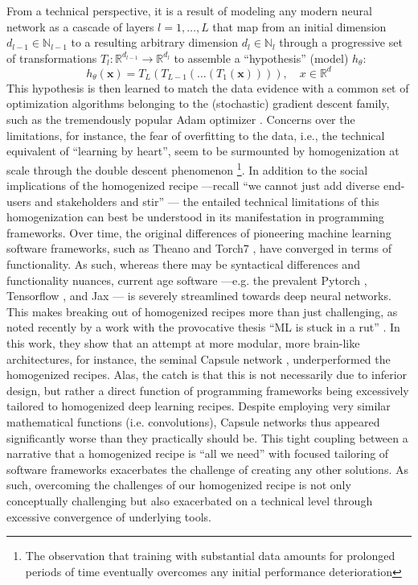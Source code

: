 \documentclass[manuscript,screen,authorversion,nonacm]{acmart}
\begin{document}
From a technical perspective, it is a result of modeling any modern neural network as a cascade of layers $l = 1, \ldots, L$ that map from an initial dimension $d_{l-1} \in \mathbb{N}_{l-1}$ to a resulting arbitrary dimension $d_{l} \in \mathbb{N}_{l}$ through a progressive set of transformations $T_l: \mathbb{R}^{d_{l-1}} \rightarrow \mathbb{R}^{d_l}$ to assemble a ``hypothesis'' (model) $h_{\theta}$:
\begin{equation}
    h_{\theta}(\mathbf{x}) = T_L(T_{L-1}(\ldots(T_1(\mathbf{x})))), \quad x \in \mathbb{R}^{d}
\end{equation}
This hypothesis is then learned to match the data evidence with a common set of optimization algorithms belonging to the (stochastic) gradient descent family, such as the tremendously popular Adam optimizer \cite{Kingma2017Adam}. Concerns over the limitations, for instance, the fear of overfitting to the data, i.e., the technical equivalent of ``learning by heart'', seem to be surmounted by homogenization at scale through the double descent phenomenon \cite{Nakkiran2020DoubleDescent}\footnote{The observation that training with substantial data amounts for prolonged periods of time eventually overcomes any initial performance deterioration}.
In addition to the social implications of the homogenized recipe ---recall ``we cannot just add diverse end-users and stakeholders and stir'' \cite{Delgado2021diverse_stir}--- the entailed technical limitations of this homogenization can best be understood in its manifestation in  programming frameworks. Over time, the original differences of pioneering machine learning software frameworks, such as Theano \cite{TheTheanoDevelopmentTeam2016} and Torch7 \cite{Collobert2011Torch7}, have converged in terms of functionality. As such, whereas there may be syntactical differences and functionality nuances, current age software ---e.g. the prevalent Pytorch \cite{Paszke2019PyTorch}, Tensorflow \cite{Abadi2016TensorFlow}, and Jax \cite{Jax2018Github}--- is severely streamlined towards deep neural networks. This makes breaking out of homogenized recipes more than just challenging, as noted recently by a work with the provocative thesis ``ML is stuck in a rut'' \cite{Barham2019MLStuckInARut}. In this work, they show that an attempt at more modular, more brain-like architectures, for instance, the seminal Capsule network \cite{Sabour2017Capsules}, underperformed the homogenized recipes. Alas, the catch is that this is not necessarily due to inferior design, but rather a direct function of programming frameworks being excessively tailored to homogenized deep learning recipes. Despite employing very similar mathematical functions (i.e. convolutions), Capsule networks thus appeared significantly worse than they practically should be. This tight coupling between a narrative that a homogenized recipe is ``all we need'' \cite{Vaswani2017AttentionAllYouNeed,Bommasani2021FoundationModels} with focused tailoring of software frameworks exacerbates the challenge of creating any other solutions. As such, overcoming the challenges of our homogenized recipe is not only conceptually challenging but also exacerbated on a technical level through excessive convergence of underlying tools. \\
\end{document}
